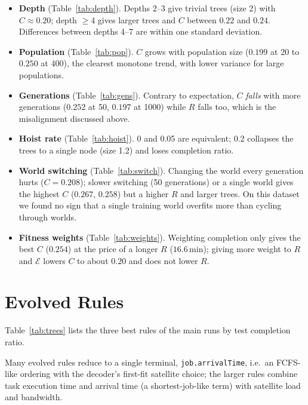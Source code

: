 \begin{itemize}
  \item \textbf{Depth} (Table~\ref{tab:depth}). Depths 2--3 give trivial trees
        (size 2) with $C\approx0.20$; depth $\ge4$ gives larger trees and
        $C$ between $0.22$ and $0.24$. Differences between depths 4--7 are within one standard deviation.
  \item \textbf{Population} (Table~\ref{tab:pop}). $C$ grows with population size
        ($0.199$ at 20 to $0.250$ at 400), the clearest monotone trend, with lower
        variance for large populations.
  \item \textbf{Generations} (Table~\ref{tab:gens}). Contrary to expectation, $C$
        \emph{falls} with more generations ($0.252$ at 50, $0.197$ at 1000) while $R$
        falls too, which is the misalignment discussed above.
  \item \textbf{Hoist rate} (Table~\ref{tab:hoist}). 0 and 0.05 are equivalent; 0.2
        collapses the trees to a single node (size 1.2) and loses completion ratio.
  \item \textbf{World switching} (Table~\ref{tab:switch}). Changing the world every
        generation hurts ($C=0.208$); slower switching (50 generations) or a single
        world gives the highest $C$ ($0.267$, $0.258$) but a higher $R$ and larger
        trees. On this dataset we found no sign that a single training world overfits
        more than cycling through worlds.
  \item \textbf{Fitness weights} (Table~\ref{tab:weights}). Weighting completion only
        gives the best $C$ ($0.254$) at the price of a longer $R$ ($16.6$\,min); giving
        more weight to $R$ and $\mathcal{E}$ lowers $C$ to about $0.20$ and does not
        lower $R$.
\end{itemize}

\section{Evolved Rules}
Table~\ref{tab:trees} lists the three best rules of the main runs by test completion ratio.
\begin{table}[h]\centering\small

\caption{Best evolved rules (\texttt{/?} is protected division).}\label{tab:trees}
\end{table}
Many evolved rules reduce to a single terminal, \texttt{job.arrivalTime}, i.e.\
an FCFS-like ordering with the decoder's first-fit satellite choice; the larger
rules combine task execution time and arrival time (a shortest-job-like term)
with satellite load and bandwidth.

